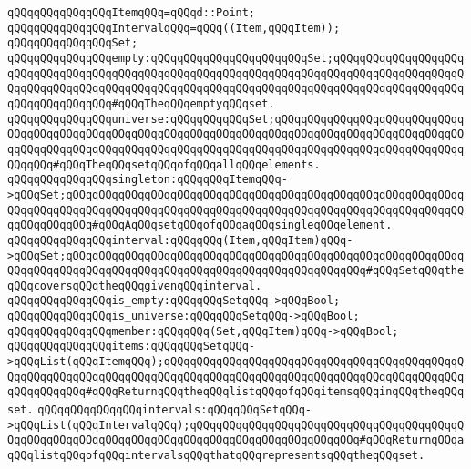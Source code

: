 \newline
\verb|qQQqqQQqqQQqqQQqItemqQQq=qQQqd::Point;|\newline
\verb|qQQqqQQqqQQqqQQqIntervalqQQq=qQQq((Item,qQQqItem));|\newline
\verb|qQQqqQQqqQQqqQQqSet;|\newline
\newline
\verb|qQQqqQQqqQQqqQQqempty:qQQqqQQqqQQqqQQqqQQqqQQqSet;qQQqqQQqqQQqqQQqqQQqqQQqqQQqqQQqqQQqqQQqqQQqqQQqqQQqqQQqqQQqqQQqqQQqqQQqqQQqqQQqqQQqqQQqqQQqqQQqqQQqqQQqqQQqqQQqqQQqqQQqqQQqqQQqqQQqqQQqqQQqqQQqqQQqqQQqqQQqqQQqqQQqqQQqqQQqqQQq#qQQqTheqQQqemptyqQQqset.|\newline
\verb|qQQqqQQqqQQqqQQquniverse:qQQqqQQqqQQqSet;qQQqqQQqqQQqqQQqqQQqqQQqqQQqqQQqqQQqqQQqqQQqqQQqqQQqqQQqqQQqqQQqqQQqqQQqqQQqqQQqqQQqqQQqqQQqqQQqqQQqqQQqqQQqqQQqqQQqqQQqqQQqqQQqqQQqqQQqqQQqqQQqqQQqqQQqqQQqqQQqqQQqqQQqqQQqqQQq#qQQqTheqQQqsetqQQqofqQQqallqQQqelements.|\newline
\newline
\verb|qQQqqQQqqQQqqQQqsingleton:qQQqqQQqItemqQQq->qQQqSet;qQQqqQQqqQQqqQQqqQQqqQQqqQQqqQQqqQQqqQQqqQQqqQQqqQQqqQQqqQQqqQQqqQQqqQQqqQQqqQQqqQQqqQQqqQQqqQQqqQQqqQQqqQQqqQQqqQQqqQQqqQQqqQQqqQQqqQQqqQQqqQQq#qQQqAqQQqsetqQQqofqQQqaqQQqsingleqQQqelement.|\newline
\newline
\verb|qQQqqQQqqQQqqQQqinterval:qQQqqQQq(Item,qQQqItem)qQQq->qQQqSet;qQQqqQQqqQQqqQQqqQQqqQQqqQQqqQQqqQQqqQQqqQQqqQQqqQQqqQQqqQQqqQQqqQQqqQQqqQQqqQQqqQQqqQQqqQQqqQQqqQQqqQQqqQQqqQQqqQQq#qQQqSetqQQqtheqQQqcoversqQQqtheqQQqgivenqQQqinterval.|\newline
\newline
\verb|qQQqqQQqqQQqqQQqis_empty:qQQqqQQqSetqQQq->qQQqBool;|\newline
\verb|qQQqqQQqqQQqqQQqis_universe:qQQqqQQqSetqQQq->qQQqBool;|\newline
\newline
\verb|qQQqqQQqqQQqqQQqmember:qQQqqQQq(Set,qQQqItem)qQQq->qQQqBool;|\newline
\newline
\verb|qQQqqQQqqQQqqQQqitems:qQQqqQQqSetqQQq->qQQqList(qQQqItemqQQq);qQQqqQQqqQQqqQQqqQQqqQQqqQQqqQQqqQQqqQQqqQQqqQQqqQQqqQQqqQQqqQQqqQQqqQQqqQQqqQQqqQQqqQQqqQQqqQQqqQQqqQQqqQQqqQQqqQQqqQQqqQQqqQQq#qQQqReturnqQQqtheqQQqlistqQQqofqQQqitemsqQQqinqQQqtheqQQqset.|\newline
\newline
\verb|qQQqqQQqqQQqqQQqintervals:qQQqqQQqSetqQQq->qQQqList(qQQqIntervalqQQq);qQQqqQQqqQQqqQQqqQQqqQQqqQQqqQQqqQQqqQQqqQQqqQQqqQQqqQQqqQQqqQQqqQQqqQQqqQQqqQQqqQQqqQQqqQQqqQQq#qQQqReturnqQQqaqQQqlistqQQqofqQQqintervalsqQQqthatqQQqrepresentsqQQqtheqQQqset.|\newline

